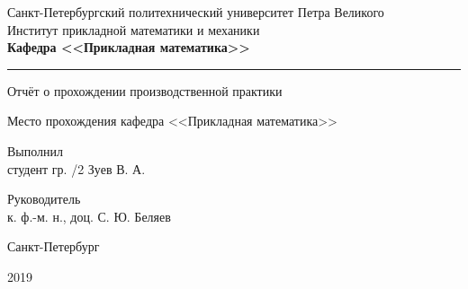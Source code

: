 \documentclass[zuev-report.tex]{subfiles}
\begin{document}
\begin{titlepage}
\begin{centering}

Санкт-Петербургский политехнический университет Петра Великого\\
Институт прикладной математики и механики\\

\textbf{Кафедра <<Прикладная математика>>}
\par
\vspace{10 pt}
\hrule
\vfill

\large
Отчёт о прохождении производственной практики\\
\normalsize
\vfill

\begin{flushleft}
Место прохождения \hfill кафедра <<Прикладная математика>>\\
\end{flushleft}
\begin{flushleft}
Выполнил\\
студент гр. /2 \hfill Зуев В. А.\\
\end{flushleft}
\begin{flushleft}
Руководитель\\
к. ф.-м. н., доц. \hfill С. Ю. Беляев\\ %
\end{flushleft}
\vfill

Санкт-Петербург
\par
2019

\end{centering}
\end{titlepage}
\end{document}
